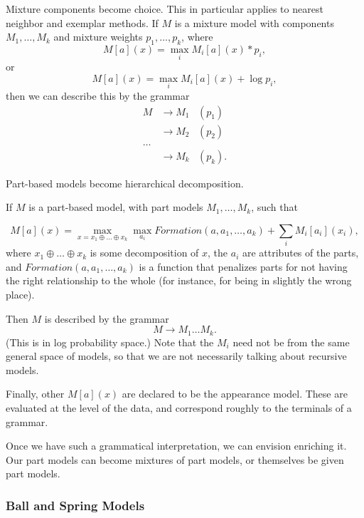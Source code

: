 \documentclass{article}
\begin{document}
\bitem

\item Mixture components become choice. This in particular applies to
  nearest neighbor and exemplar methods. If $M$ is a mixture model
  with components $M_1, \dots, M_k$ and mixture weights $p_1, \dots,
  p_k$, where
  $$ M[a](x) = \max_i M_i[a](x) * p_i, $$ or
  $$ M[a](x) = \max_i M_i[a](x) + \log p_i, $$
  then we can describe this by the grammar
\begin{align*}
M &\to M_1 & (p_1)\\
&\to M_2 & (p_2) \\
\dots\\
&\to M_k & (p_k).
\end{align*}

\item Part-based models become hierarchical decomposition.

  If $M$ is a part-based model, with part models $M_1, \dots, M_k$, such that

$$ M[a](x) = \max_{x = x_1 \oplus \dots \oplus x_k} \max_{a_i}
  Formation(a,a_1,\dots,a_k) + \sum_i M_i[a_i](x_i), $$ where $x_1
  \oplus \dots \oplus x_k$ is some decomposition of $x$, the $a_i$ are
  attributes of the parts, and $Formation(a,a_1,\dots,a_k)$ is a
  function that penalizes parts for not having the right relationship
  to the whole (for instance, for being in slightly the wrong place).

Then $M$ is described by the grammar
$$ M \to M_1 \dots M_k. $$ (This is in log probability space.)  Note
that the $M_i$ need not be from the same general space of models, so
that we are not necessarily talking about recursive models.

\item Finally, other $M[a](x)$ are declared to be the appearance
  model. These are evaluated at the level of the data, and correspond
  roughly to the terminals of a grammar.

\eitem

Once we have such a grammatical interpretation, we can envision
enriching it. Our part models can become mixtures of part models, or
themselves be given part models.

\subsubsection{Ball and Spring Models} 
\end{document}
